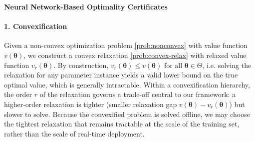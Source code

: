 \documentclass[10pt]{article} %
\theoremstyle{plain}
\theoremstyle{definition}
\theoremstyle{remark}
\begin{document}

\begin{tcolorbox}[
    breakable,                    %
    left=10pt, right=10pt,        %
    top=10pt, bottom=10pt,
    grow to left by=-7pt,        %
    grow to right by=-7pt,       %
    colback=blue!8,               %
    colframe=black,               %
    sharp corners,                %
    boxrule=0.4pt                 %
]

\begin{center}
    \large
    \textbf{Neural Network-Based Optimality Certificates}
\end{center}

\paragraph{1. Convexification} Given a non-convex optimization problem \cref{prob:nonconvex}{}{} with value function $v(\bm{\theta})$, we construct a convex relaxation \cref{prob:convex-relax}{}{} with relaxed value function $v_r(\bm{\theta}).$
By construction, $v_r(\bm{\theta}) \leq v(\bm{\theta})$ for all $\bm{\theta} \in \Theta$, i.e. solving the relaxation for any parameter instance yields a valid lower bound on the true optimal value, which is generally intractable.
Within a convexification hierarchy, the order $r$ of the relaxation governs a trade-off central to our framework: a higher-order relaxation is tighter (smaller relaxation gap $v(\bm{\theta}) - v_r(\bm{\theta})$) but slower to solve. Because the convexified problem is solved offline, we may choose the tightest relaxation that remains tractable at the scale of the training set, rather than the scale of real-time deployment.
\\

\end{tcolorbox}
\end{document}
